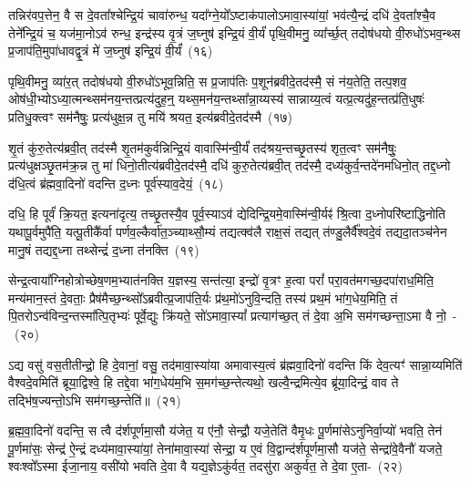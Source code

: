 तन्निर॑वप॒त्तेन॒ वै स दे॒वता᳚श्चेन्द्रि॒यं चावा॑रुन्ध॒ यदा᳚ग्ने॒यो᳚\-ऽष्टाक॑पालो\-ऽमावा॒स्या॑यां॒ भव॑त्यै॒न्द्रं दधि॑ दे॒वता᳚श्चै॒व तेने᳚न्द्रि॒यं च॒ यज॑मा॒नो\-ऽव॑ रुन्ध॒ इन्द्र॑स्य वृ॒त्रं ज॒घ्नुष॑ इन्द्रि॒यं वी॒र्यं॑ पृथि॒वीमनु॒ व्या᳚र्च्छ॒त् तदोष॑धयो वी॒रुधो॑\-ऽभव॒न्थ्स प्र॒जा\-प॑ति॒मुपा॑धावद्वृ॒त्रं मे॑ ज॒घ्नुष॑ इन्द्रि॒यं वी॒र्यं॑~(१६)

पृथि॒वीमनु॒ व्या॑र॒त् तदोष॑धयो वी॒रुधो॑\-ऽभूव॒न्निति॒ स प्र॒जा\-प॑तिः प॒शून॑ब्रवीदे॒तद॑स्मै॒ सं न॑य॒तेति॒ तत्प॒शव॒ ओष॑धी॒भ्यो\-ऽध्या॒त्मन्थ्सम॑नय॒न्तत्प्रत्य॑दुह॒न्॒ यथ्स॒मन॑य॒न्तथ्सा᳚न्ना॒य्यस्य॑ सान्नाय्य॒त्वं यत्प्र॒त्यदु॑ह॒न्तत्प्र॑ति॒धुषः॑ प्रतिधु॒क्त्वꣳ सम॑नैषुः॒ प्रत्य॑धुक्ष॒न्न तु मयि॑ श्रयत॒ इत्य॑ब्रवीदे॒तद॑स्मै~(१७)

शृ॒तं कु॑रु॒तेत्य॑ब्रवी॒त् तद॑स्मै शृ॒तम॑कुर्वन्निन्द्रि॒यं वावास्मि॑न्वी॒र्यं॑ तद॑श्रय॒न्तच्छृ॒तस्य॑ शृत॒त्वꣳ सम॑नैषुः॒ प्रत्य॑धुक्षञ्छृ॒तम॑क्र॒न्न तु मा॑ धिनो॒तीत्य॑ब्रवीदे॒तद॑स्मै॒ दधि॑ कुरु॒तेत्य॑ब्रवी॒त् तद॑स्मै॒ दध्य॑कुर्व॒न्तदे॑नमधिनो॒त् तद्द॒ध्नो द॑धि॒त्वं ब्र॑ह्मवा॒दिनो॑ वदन्ति द॒ध्नः पूर्व॑स्याव॒देयं॒~(१८)

दधि॒ हि पूर्वं॑ क्रि॒यत॒ इत्यना॑दृत्य॒ तच्छृ॒तस्यै॒व पूर्व॒स्या\-ऽव॑ द्येदिन्द्रि॒यमे॒वास्मि॑न्वी॒र्यꣴ॑ श्रि॒त्वा द॒ध्नोपरि॑ष्टाद्धिनोति यथापू॒र्वमुपै॑ति॒ यत्पू॒तीकै᳚र्वा पर्णव॒ल्कैर्वा॑त॒ञ्च्याथ्सौ॒म्यं तद्यत्क्व॑लै राक्ष॒सं तद्यत् त॑ण्डु॒लैर्वै᳚श्वदे॒वं तद्यदा॒तञ्च॑नेन मानु॒षं तद्यद्द॒ध्ना तथ्सेन्द्रं॑ द॒ध्ना त॑नक्ति~(१९)

सेन्द्र॒त्वाया᳚ग्निहोत्रोच्छेष॒णम॒भ्यात॑नक्ति य॒ज्ञस्य॒ सन्त॑त्या॒ इन्द्रो॑ वृ॒त्रꣳ ह॒त्वा परां᳚ परा॒वत॑मगच्छ॒दपा॑राध॒मिति॒ मन्य॑मान॒स्तं दे॒वताः॒ प्रैष॑मैच्छ॒न्थ्सो᳚\-ऽब्रवीत्प्र॒जा\-प॑ति॒र्यः प्र॑थ॒मो॑\-ऽनुवि॒न्दति॒ तस्य॑ प्रथ॒मं भा॑ग॒धेय॒मिति॒ तं पि॒तरो\-ऽन्व॑विन्द॒न्तस्मा᳚त्पि॒तृभ्यः॑ पूर्वे॒द्युः क्रि॑यते॒ सो॑\-ऽमावा॒स्यां᳚ प्रत्याग॑च्छ॒त् तं दे॒वा अ॒भि सम॑गच्छन्ता॒\-ऽमा वै नो॒~-~(२०)

ऽद्य वसु॑ वस॒तीतीन्द्रो॒ हि दे॒वानां॒ वसु॒ तद॑मावा॒स्या॑या अमावास्य॒त्वं ब्र॑ह्मवा॒दिनो॑ वदन्ति किं देव॒त्यꣳ॑ सान्ना॒य्यमिति॑ वैश्वदे॒वमिति॑ ब्रूया॒द्विश्वे॒ हि तद्दे॒वा भा॑ग॒धेय॑म॒भि स॒मग॑च्छ॒न्तेत्यथो॒ खल्वै॒न्द्रमित्ये॒व ब्रू॑या॒दिन्द्रं॒ वाव ते तद्भि॑ष॒ज्यन्तो॒\-ऽभि सम॑गच्छ॒न्तेति॑॥~(२१)

{}%

ब्र॒ह्म॒वा॒दिनो॑ वदन्ति॒ स त्वै द॑र्\mbox{}शपूर्णमा॒सौ य॑जेत॒ य ए॑नौ॒ सेन्द्रौ॒ यजे॒तेति॑ वैमृ॒धः पू॒र्णमा॑से\-ऽनुनिर्वा॒प्यो॑ भवति॒ तेन॑ पू॒र्णमा॑सः॒ सेन्द्र॑ ऐ॒न्द्रं दध्य॑मावा॒स्या॑यां॒ तेना॑मावा॒स्या॑ सेन्द्रा॒ य ए॒वं वि॒द्वान्द॑र्\mbox{}शपूर्णमा॒सौ यज॑ते॒ सेन्द्रा॑वे॒वैनौ॑ यजते॒ श्वःश्वो᳚\-ऽस्मा ईजा॒नाय॒ वसी॑यो भवति दे॒वा वै यद्य॒ज्ञे\-ऽकु॑र्वत॒ तदसु॑रा अकुर्वत॒ ते दे॒वा ए॒ता-~(२२)

